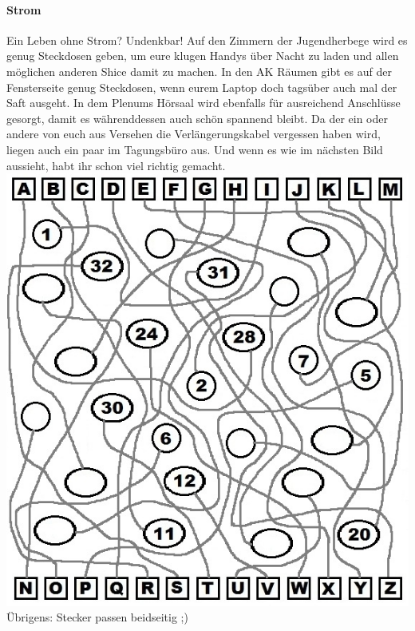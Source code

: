   \paragraph{Strom}
  Ein Leben ohne Strom? Undenkbar!
  Auf den Zimmern der Jugendherbege wird es genug Steckdosen geben, um eure klugen Handys über Nacht zu laden
  und allen möglichen anderen Shice damit zu machen. In den AK Räumen gibt es auf der Fensterseite
  genug Steckdosen, wenn eurem Laptop doch tagsüber auch mal der Saft ausgeht. In dem Plenums Hörsaal
  wird ebenfalls für ausreichend Anschlüsse gesorgt, damit es währenddessen auch schön spannend bleibt.
  Da der ein oder andere von euch aus Versehen die Verlängerungskabel vergessen haben wird,
  liegen auch ein paar im Tagungsbüro aus. Und wenn es wie im nächsten Bild aussieht,
  habt ihr schon viel richtig gemacht.
  \includegraphics{kabel_raetsel.jpg}
  Übrigens: Stecker passen beidseitig ;)

